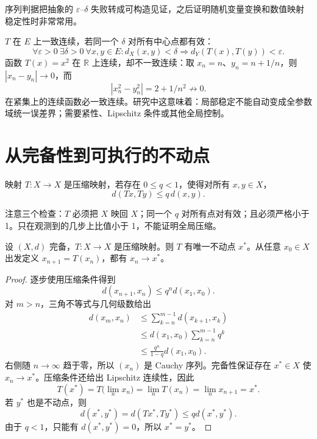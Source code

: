 序列判据把抽象的 $\varepsilon$--$\delta$ 失败转成可构造见证，之后证明随机变量变换和数值映射稳定性时非常常用。


$T$ 在 $E$ 上一致连续，若同一个 $\delta$ 对所有中心点都有效：
\[
 \forall\varepsilon>0\ \exists\delta>0\ \forall x,y\in E:
 d_X(x,y)<\delta\Longrightarrow d_Y(T(x),T(y))<\varepsilon.
\]
函数 $T(x)=x^2$ 在 $\mathbb R$ 上连续，却不一致连续：取 $x_n=n$、$y_n=n+1/n$，则 $|x_n-y_n|\to0$，而
\[
 |x_n^2-y_n^2|=2+1/n^2\not\to0.
\]
在紧集上的连续函数必一致连续。研究中这意味着：局部稳定不能自动变成全参数域统一误差界；需要紧性、Lipschitz 条件或其他全局控制。

\section{从完备性到可执行的不动点}

\begin{definition}[压缩映射]
映射 $T:X\to X$ 是压缩映射，若存在 $0\leq q<1$，使得对所有 $x,y\in X$，
\[
  d(Tx,Ty)\leq q\,d(x,y).
\]
\end{definition}



注意三个检查：$T$ 必须把 $X$ 映回 $X$；同一个 $q$ 对所有点对有效；且必须严格小于 1。只在观测到的几步上比值小于 1，不能证明全局压缩。

\begin{theorem}
设 $(X,d)$ 完备，$T:X\to X$ 是压缩映射。则 $T$ 有唯一不动点 $x^*$。从任意 $x_0\in X$ 出发定义 $x_{n+1}=T(x_n)$，都有 $x_n\to x^*$。
\end{theorem}

\begin{proof}
逐步使用压缩条件得到
\[
 d(x_{n+1},x_n)\leq q^n d(x_1,x_0).
\]
对 $m>n$，三角不等式与几何级数给出
\[
\begin{aligned}
d(x_m,x_n)
&\leq\sum_{k=n}^{m-1}d(x_{k+1},x_k)\\
&\leq d(x_1,x_0)\sum_{k=n}^{m-1}q^k\\
&\leq\frac{q^n}{1-q}d(x_1,x_0).
\end{aligned}
\]
右侧随 $n\to\infty$ 趋于零，所以 $(x_n)$ 是 Cauchy 序列。完备性保证存在 $x^*\in X$ 使 $x_n\to x^*$。压缩条件还给出 Lipschitz 连续性，因此
\[
 T(x^*)=T\bigl(\lim_nx_n\bigr)=\lim_nT(x_n)=\lim_nx_{n+1}=x^*.
\]
若 $y^*$ 也是不动点，则
\[
 d(x^*,y^*)=d(Tx^*,Ty^*)\leq qd(x^*,y^*).
\]
由于 $q<1$，只能有 $d(x^*,y^*)=0$，所以 $x^*=y^*$。
\end{proof}

